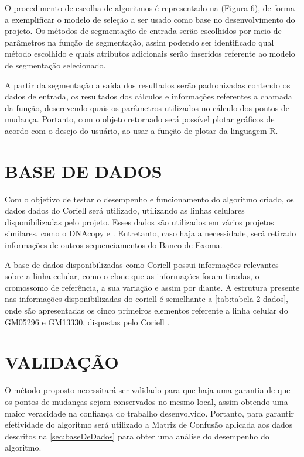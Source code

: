 O procedimento de escolha de algoritmos é representado na (Figura 6), de forma a exemplificar o modelo de seleção a ser usado como base no desenvolvimento do projeto. Os métodos de segmentação de entrada serão escolhidos por meio de parâmetros na função de segmentação, assim podendo ser identificado qual método escolhido e quais atributos adicionais serão inseridos referente ao modelo de segmentação selecionado. 

A partir da segmentação a saída dos resultados serão padronizadas contendo os dados de entrada, os resultados dos cálculos e informações referentes a chamada da função, descrevendo quais os parâmetros utilizados no cálculo dos pontos de mudança. Portanto, com o objeto retornado será possível plotar gráficos de acordo com o desejo do usuário, ao usar a função de plotar da linguagem R.

\section{BASE DE DADOS} 
\label{sec:baseDeDados} 

Com o objetivo de testar o desempenho e funcionamento do algoritmo criado, os dados dados do Coriell \cite{Snijders2001} será utilizado, utilizando as linhas celulares disponibilizadas pelo projeto. Esses dados são utilizados em vários projetos similares, como o DNAcopy \cite{Olshen2004} e \cite{Girimurugan2018}. Entretanto, caso haja a necessidade, será retirado informações de outros sequenciamentos do Banco de Exoma.

A base de dados disponibilizadas como Coriell possui informações relevantes sobre a linha celular, como o clone que as informações foram tiradas, o cromossomo de referência, a sua variação e assim por diante. A estrutura presente nas informações disponibilizadas do coriell é semelhante a \autoref{tab:tabela-2-dados}, onde são apresentadas os cinco primeiros elementos referente a linha celular do GM05296 e GM13330, dispostas pelo Coriell \cite{Snijders2001}. 



\section{VALIDAÇÃO} 

O método proposto necessitará ser validado para que haja uma garantia de que os pontos de mudanças sejam conservados no mesmo local, assim obtendo uma maior veracidade na confiança do trabalho desenvolvido. Portanto, para garantir efetividade do algoritmo será utilizado a Matriz de Confusão aplicada aos dados descritos na \autoref{sec:baseDeDados} para obter uma análise do desempenho do algoritmo.